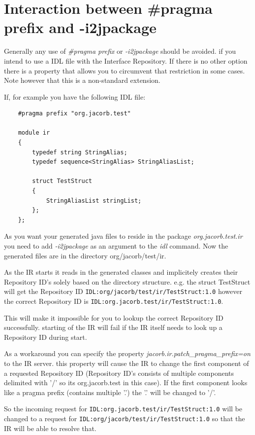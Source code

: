 \section{Interaction between \#pragma prefix and -i2jpackage}
\label{sec:ifr_pragma_i2jpackage}

Generally any use of \emph{\#pragma prefix} or \emph{-i2jpackage} should be avoided.
if you intend to use a IDL file with the Interface Repository.
If there is no other option there is a property that allows you to
circumvent that restriction in some cases.
Note however that this is a non-standard extension.

If, for example you have the following IDL file:
\begin{verbatim}
    #pragma prefix "org.jacorb.test"

    module ir
    {
        typedef string StringAlias;
        typedef sequence<StringAlias> StringAliasList;

        struct TestStruct
        {
            StringAliasList stringList;
        };
    };
\end{verbatim}

As you want your generated java files to reside in the package \emph{org.jacorb.test.ir} you
need to add \emph{-i2jpackage} as an argument to the \emph{idl} command.
Now the generated files are in the directory org/jacorb/test/ir.

As the IR starts it reads in the generated classes and implicitely creates
their Repository ID's solely based on the directory structure.
e.g. the struct TestStruct will get the Repository ID {\tt IDL:org/jacorb/test/ir/TestStruct:1.0}
however the correct Repository ID is {\tt IDL:org.jacorb.test/ir/TestStruct:1.0}.

This will make it impossible for you to lookup the correct Repository ID successfully.
starting of the IR will fail if the IR itself needs to look up a Repository ID during start.

As a workaround you can specify the property \emph{jacorb.ir.patch\_pragma\_prefix=on} to the IR server.
this property will cause the IR to change the first component of a requested Repository ID (Repository ID's
consists of multiple components delimited with '/' so its org.jacorb.test in this case).
If the first component looks like a pragma prefix (contains multiple '.') the '.' will be changed to '/'.

So the incoming request for {\tt IDL:org.jacorb.test/ir/TestStruct:1.0} will be
changed to a request for {\tt IDL:org/jacorb/test/ir/TestStruct:1.0} so that the IR will be able to resolve that.

